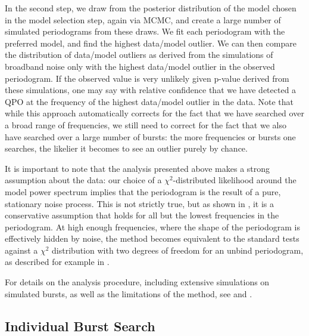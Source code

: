\documentclass[numberedappendix]{emulateapj}
\begin{document}
In the second step, we draw from the posterior distribution of the model chosen in the model selection step, again via MCMC, and create a large number of simulated periodograms from these draws. We fit each periodogram with the preferred model, and find the highest data/model outlier. We can then compare the distribution of data/model outliers as derived from the simulations of broadband noise only with the highest data/model outlier in the observed periodogram. If the observed value is very unlikely given p-value derived from these simulations, one may say with relative confidence that we have detected a QPO at the frequency of the highest data/model outlier in the data. Note that while this approach automatically corrects for the fact that we have searched over a broad range of frequencies, we still need to correct for the fact that we also have searched over a large number of bursts: the more frequencies or bursts one searches, the likelier it becomes to see an outlier purely by chance. 

It is important to note that the analysis presented above makes a strong assumption about the data: our choice of a $\chi^2$-distributed likelihood around the model power spectrum implies that the periodogram is the result of a pure, stationary noise process. This is not strictly true, but as shown in \citet{huppenkothen2013}, it is a conservative assumption that holds for all but the lowest frequencies in the periodogram. At high enough frequencies, where the shape of the periodogram is effectively hidden by noise, the method becomes equivalent to the standard tests against a $\chi^2$ distribution with two degrees of freedom for an unbind periodogram, as described for example in \citet{vanderklis1989}.

For details on the analysis procedure, including extensive simulations on simulated bursts, as well as the limitations of the method, see \citet{huppenkothen2013} and \citet{vaughan2010}.

\subsection{Individual Burst Search}
\label{sec:psd_individual}
\end{document}
